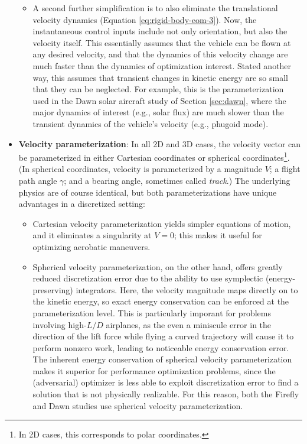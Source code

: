 \begin{itemize}
\begin{itemize}
        \item A second further simplification is to also eliminate the translational velocity dynamics (Equation \ref{eq:rigid-body-eom-3}). Now, the instantaneous control inputs include not only orientation, but also the velocity itself. This essentially assumes that the vehicle can be flown at any desired velocity, and that the dynamics of this velocity change are much faster than the dynamics of optimization interest. Stated another way, this assumes that transient changes in kinetic energy are so small that they can be neglected. For example, this is the parameterization used in the Dawn solar aircraft study of Section \ref{sec:dawn}, where the major dynamics of interest (e.g., solar flux) are much slower than the transient dynamics of the vehicle's velocity (e.g., phugoid mode).
    \end{itemize}
    \item \textbf{Velocity parameterization}: In all 2D and 3D cases, the velocity vector can be parameterized in either Cartesian coordinates or spherical coordinates\footnote{In 2D cases, this corresponds to polar coordinates.}. (In spherical coordinates, velocity is parameterized by a magnitude $V$; a flight path angle $\gamma$; and a bearing angle, sometimes called \emph{track}.) The underlying physics are of course identical, but both parameterizations have unique advantages in a discretized setting:
    \begin{itemize}
        \item Cartesian velocity parameterization yields simpler equations of motion, and it eliminates a singularity at $V=0$; this makes it useful for optimizing aerobatic maneuvers.
        \item Spherical velocity parameterization, on the other hand, offers greatly reduced discretization error due to the ability to use symplectic (energy-preserving) integrators. Here, the velocity magnitude maps directly on to the kinetic energy, so exact energy conservation can be enforced at the parameterization level. This is particularly imporant for problems involving high-$L/D$ airplanes, as the even a miniscule error in the direction of the lift force while flying a curved trajectory will cause it to perform nonzero work, leading to noticeable energy conservation error. The inherent energy conservation of spherical velocity parameterization makes it superior for performance optimization problems, since the (adversarial) optimizer is less able to exploit discretization error to find a solution that is not physically realizable. For this reason, both the Firefly and Dawn studies use spherical velocity parameterization.
    \end{itemize}
\end{itemize}

